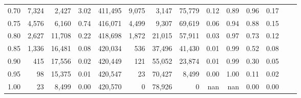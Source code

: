 \begin{tabular}{rrrrrrrrrrrrrr}
0.70 &   7,324 &   2,427 &      3.02 &  411,495 &    9,075 &   3,147 &  75,779 &  0.12 &  0.89 &  0.96 &      0.17 \\
0.75 &   4,576 &   6,160 &      0.74 &  416,071 &    4,499 &   9,307 &  69,619 &  0.06 &  0.94 &  0.88 &      0.15 \\
0.80 &   2,627 &  11,708 &      0.22 &  418,698 &    1,872 &  21,015 &  57,911 &  0.03 &  0.97 &  0.73 &      0.12 \\
0.85 &   1,336 &  16,481 &      0.08 &  420,034 &      536 &  37,496 &  41,430 &  0.01 &  0.99 &  0.52 &      0.08 \\
0.90 &     415 &  17,556 &      0.02 &  420,449 &      121 &  55,052 &  23,874 &  0.01 &  0.99 &  0.30 &      0.05 \\
0.95 &      98 &  15,375 &      0.01 &  420,547 &       23 &  70,427 &   8,499 &  0.00 &  1.00 &  0.11 &      0.02 \\
1.00 &      23 &   8,499 &      0.00 &  420,570 &        0 &  78,926 &       0 &   nan &   nan &  0.00 &      0.00 \\
\bottomrule
\end{tabular}
